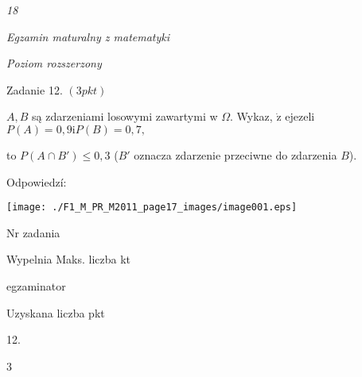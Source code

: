 \documentclass[a4paper,12pt]{article}
\begin{document}
{\it 18}

{\it Egzamin maturalny z matematyki}

{\it Poziom rozszerzony}

Zadanie 12. $(3pkt)$

$A, B$ są zdarzeniami losowymi zawartymi w $\Omega$. Wykaz, $\dot{\mathrm{z}}$ ejezeli $P(A)=0,9 \mathrm{i}P(B)=0,7,$

to $P(A\cap B')\leq 0,3$ ($B'$ oznacza zdarzenie przeciwne do zdarzenia $B$).

Odpowiedzí:
\begin{center}
\texttt{[image: ./F1\_M\_PR\_M2011\_page17\_images/image001.eps]}
\end{center}
Nr zadania

Wypelnia Maks. liczba kt

egzaminator

Uzyskana liczba pkt

12.

3
\end{document}
